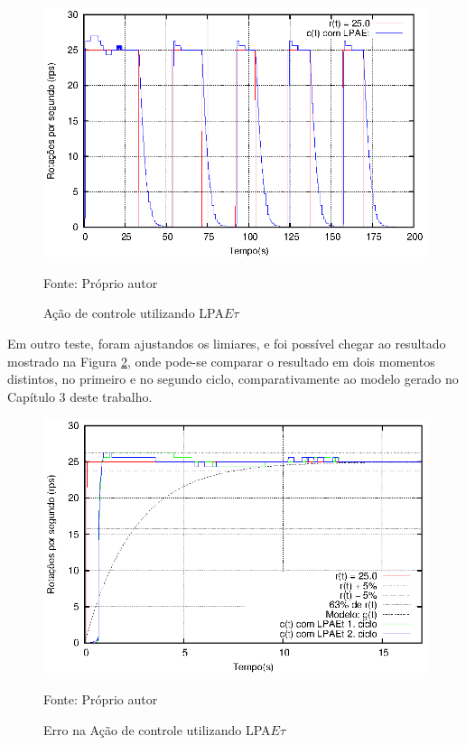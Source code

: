 \begin{figure}[!htb]%
\caption{Ação de controle utilizando LPA$E\tau$}
\vspace{-1cm}\center\includegraphics[scale=1.6]{./plot/LPAEt-delta.eps}
\label{fig:acaoLPAEtDelta}

{\small Fonte: Próprio autor}
\end{figure}

Em outro teste, foram ajustandos os limiares,
e foi possível chegar ao resultado mostrado na Figura \ref{fig:LPAEterro}, 
onde pode-se comparar o resultado em dois momentos distintos,
no primeiro e no segundo ciclo,
comparativamente ao modelo gerado no Capítulo 3 deste trabalho.


\begin{figure}[!htb]%
\caption{Erro na Ação de controle utilizando LPA$E\tau$}
\vspace{-1cm}\center\includegraphics[scale=1.5]{./plot/LPAEt-erro.eps}
\label{fig:LPAEterro}

{\small Fonte: Próprio autor}
\end{figure}

